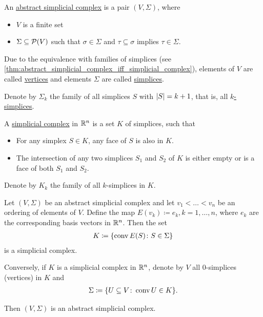\begin{definition}\label{def:abstract_simplicial_complex}\cite[definition 2.1]{Carlsson2009}
  An \uline{abstract simplicial complex} is a pair $(V, \Sigma)$, where
  \begin{itemize}
    \item $V$ is a finite set
    \item $\Sigma \subseteq \operatorname{\mathcal P}(V)$ such that $\sigma \in \Sigma$ and $\tau \subseteq \sigma$ implies $\tau \in \Sigma$.
  \end{itemize}

  Due to the equivalence with families of simplices (see \cref{thm:abstract_simplicial_complex_iff_simplicial_complex}), elements of $V$ are called \uline{vertices} and elements $\Sigma$ are called \uline{simplices}.

  Denote by $\Sigma_k$ the family of all simplices $S$ with $\left\vert S \right\vert = k + 1$, that is, all \uline{$k$-simplices}.
\end{definition}

\begin{definition}\label{def:simplicial_complex}
  A \uline{simplicial complex} in $\mathbb R^n$ is a set $K$ of simplices, such that
  \begin{itemize}
    \item For any simplex $S \in K$, any face of $S$ is also in $K$.
    \item The intersection of any two simplices $S_1$ and $S_2$ of $K$ is either empty or is a face of both $S_1$ and $S_2$.
  \end{itemize}

  Denote by $K_k$ the family of all $k$-simplices in $K$.
\end{definition}

\begin{proposition}\label{thm:abstract_simplicial_complex_iff_simplicial_complex}
  Let $(V, \Sigma)$ be an abstract simplicial complex and let $v_1 < \ldots < v_n$ be an ordering of elements of $V$. Define the map $E(v_k) \coloneqq e_k, k = 1, \ldots, n$, where $e_k$ are the corresponding basis vectors in $\mathbb R^n$. Then the set
  \begin{align*}
    K \coloneqq \{ \operatorname{conv} E(S) \colon S \in \Sigma \}
  \end{align*}
  is a simplicial complex.

  Conversely, if $K$ is a simplicial complex in $\mathbb R^n$, denote by $V$ all $0$-simplices (vertices) in $K$ and
  \begin{align*}
    \Sigma \coloneqq \{ U \subseteq V \colon \operatorname{conv} U \in K \}.
  \end{align*}

  Then $(V, \Sigma)$ is an abstract simplicial complex.
\end{proposition}

